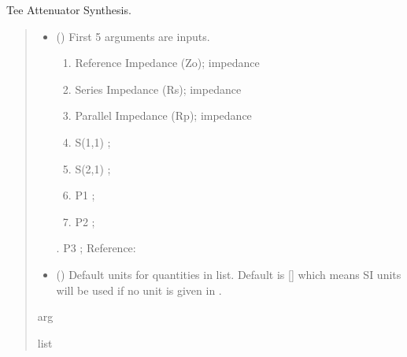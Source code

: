\documentclass[letterpaper,10pt,english]{sphinxmanual}
\begin{document}

\begin{fulllineitems}
\label{\detokenize{components:components.Tee_Attenuator_Synthesis}}
\pysigstartsignatures
{}
\pysigstopsignatures
\sphinxAtStartPar
Tee Attenuator Synthesis.
\begin{quote}\begin{description}
\begin{itemize}
\item {}
\sphinxAtStartPar
{} () \textendash{}
\sphinxAtStartPar
First 5 arguments are inputs.
\begin{enumerate}
%
\item {}
\sphinxAtStartPar
Reference Impedance (Zo); impedance

\item {}
\sphinxAtStartPar
Series Impedance (Rs); impedance

\item {}
\sphinxAtStartPar
Parallel Impedance (Rp); impedance

\item {}
\sphinxAtStartPar
S(1,1) ;

\item {}
\sphinxAtStartPar
S(2,1) ;

\item {}
\sphinxAtStartPar
P1 ;

\item {}
\sphinxAtStartPar
P2 ;

\end{enumerate}

. P3 ;
Reference:


\item {}
\sphinxAtStartPar
{} (\sphinxstyleliteralemphasis{\sphinxupquote{, }}) \textendash{} Default units for quantities in  list. Default is {[}{]} which means SI units will be used if no unit is given in .

\end{itemize}

\sphinxAtStartPar
arg

\sphinxAtStartPar
list

\end{description}\end{quote}

\end{fulllineitems}
\end{document}
